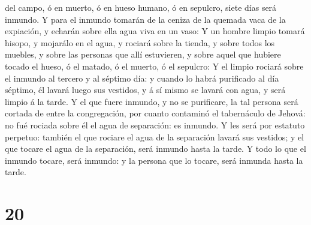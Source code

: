 del campo, ó en muerto, ó en hueso humano, ó en sepulcro, siete días
será inmundo.  Y para el inmundo tomarán de la ceniza de la
quemada vaca de la expiación, y echarán sobre ella agua viva en un vaso:
 Y un hombre limpio tomará hisopo, y mojarálo en el agua, y
rociará sobre la tienda, y sobre todos los muebles, y sobre las personas
que allí estuvieren, y sobre aquel que hubiere tocado el hueso, ó el
matado, ó el muerto, ó el sepulcro:  Y el limpio rociará
sobre el inmundo al tercero y al séptimo día: y cuando lo habrá
purificado al día séptimo, él lavará luego sus vestidos, y á sí mismo se
lavará con agua, y será limpio á la tarde.  Y el que fuere
inmundo, y no se purificare, la tal persona será cortada de entre la
congregación, por cuanto contaminó el tabernáculo de Jehová: no fué
rociada sobre él el agua de separación: es inmundo.  Y les
será por estatuto perpetuo: también el que rociare el agua de la
separación lavará sus vestidos; y el que tocare el agua de la
separación, será inmundo hasta la tarde.  Y todo lo que el
inmundo tocare, será inmundo: y la persona que lo tocare, será inmunda
hasta la tarde.

\hypertarget{section-19}{%
\section{20}\label{section-19}}

